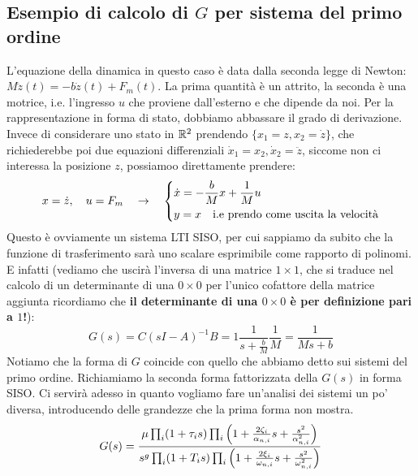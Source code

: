 \subsection{Esempio di calcolo di $G$ per sistema del primo ordine}
L'equazione della dinamica in questo caso è data dalla seconda legge di Newton: $M\ddot z(t) = -b\dot z(t) + F_m(t)$. La prima quantità è un attrito, la seconda è una motrice, i.e. l'ingresso $u$ che proviene dall'esterno e che dipende da noi. Per la rappresentazione in forma di stato, dobbiamo abbassare il grado di derivazione. Invece di considerare uno stato in $\mathbb{R}^2$ prendendo $\{ x_1 =  z, x_2 = \dot z \}$, che richiederebbe poi due equazioni differenziali $\dot x_1 = x_2, \dot x_2 = \ddot z$, siccome non ci interessa la posizione $z$, possiamoo direttamente prendere:
\begin{equation*}
x = \dot z, \quad u = F_m \quad \rightarrow \quad \begin{dcases}
\dot x = -\frac{b}{M} x+\frac{1}{M}u \\
y = x \quad \textrm{i.e prendo come uscita la velocità}
\end{dcases}
\end{equation*}
Questo è ovviamente un sistema LTI SISO, per cui sappiamo da subito che la funzione di trasferimento sarà uno scalare esprimibile come rapporto di polinomi. E infatti (vediamo che uscirà l'inversa di una matrice $1\times 1$, che si traduce nel calcolo di un determinante di una $0\times 0$ per l'unico cofattore della matrice aggiunta \rarr ricordiamo che \textbf{il determinante di una $0\times 0$ è per definizione pari a $1$!}):
\begin{equation*}
G(s) = C(sI-A)^{-1} B = 1\frac{1}{s+\frac{b}{M}} \frac{1}{M} = \frac{1}{Ms+b}
\end{equation*}
Notiamo che la forma di $G$ coincide con quello che abbiamo detto sui sistemi del primo ordine.
\bb
Richiamiamo la seconda forma fattorizzata della $G(s)$ in forma SISO. Ci servirà adesso in quanto vogliamo fare un'analisi dei sistemi un po' diversa, introducendo delle grandezze che la prima forma  non mostra.
\begin{equation*}
G(s) = \frac{\mu\prod_i (1+\tau_i s) \prod_i \left( 1+\frac{2\zeta_i}{\alpha_{n,i}}s + \frac{s^2}{\alpha^2_{n,i}} \right)}{s^g \prod_i (1+T_i s)\prod_i \left( 1 + \frac{2\xi_i}{\omega_{n,i}}s + \frac{s^2}{\omega^2_{n,i}} \right)}
\end{equation*}
\newpage
